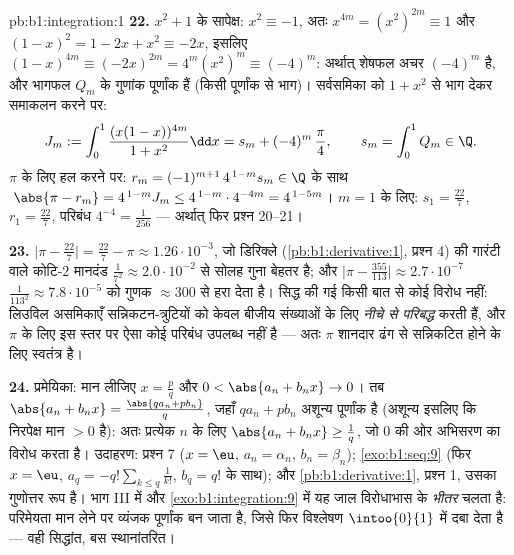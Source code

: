 \begin{solution}{pb:b1:integration:1}
\textbf{22.} $x^2 + 1$ के सापेक्ष: $x^2 \equiv -1$, अतः $x^{4m} = (x^2)^{2m}
\equiv 1$ और $(1 - x)^2 = 1 - 2x + x^2 \equiv -2x$, इसलिए $(1-x)^{4m} \equiv
(-2x)^{2m} = 4^m (x^2)^m \equiv (-4)^m$: अर्थात् शेषफल अचर $(-4)^m$ है, और
भागफल $Q_m$ के गुणांक पूर्णांक हैं (किसी  पूर्णांक  से भाग)।
सर्वसमिका को $1 + x^2$ से भाग देकर समाकलन करने पर:
\[
J_m := \int_0^1 \frac{(x(1-x))^{4m}}{1+x^2}\dd x
= s_m + (-4)^m\,\frac{\pi}{4},
\qquad s_m = \int_0^1 Q_m \in \Q .
\]
$\pi$ के लिए हल करने पर: $r_m = (-1)^{m+1}\,4^{\,1-m} s_m \in \Q$ के साथ
$\;\abs{\pi - r_m} = 4^{\,1-m} J_m \leq 4^{\,1-m}\cdot4^{-4m} = 4^{\,1-5m}$।
$m = 1$ के लिए: $s_1 = \frac{22}{7}$, $r_1 = \frac{22}{7}$, परिबंध $4^{-4} =
\frac{1}{256}$ --- अर्थात् फिर प्रश्न 20--21।

\textbf{23.} $\bigl|\pi - \frac{22}{7}\bigr| = \frac{22}{7} - \pi \approx
1.26\cdot10^{-3}$, जो डिरिक्ले (\cref{pb:b1:derivative:1}, प्रश्न 4) की
गारंटी वाले कोटि-$2$ मानदंड $\frac{1}{7^2} \approx 2.0\cdot10^{-2}$ से सोलह
गुना बेहतर है; और $\bigl|\pi - \frac{355}{113}\bigr| \approx
2.7\cdot10^{-7}$ $\frac{1}{113^2} \approx 7.8\cdot10^{-5}$ को गुणक $\approx
300$ से हरा देता है। सिद्ध की गई किसी बात से कोई विरोध नहीं: लिउविल असमिकाएँ
सन्निकटन-त्रुटियों को केवल बीजीय संख्याओं के लिए \emph{नीचे से परिबद्ध} करती
हैं, और $\pi$ के लिए इस स्तर पर ऐसा कोई परिबंध उपलब्ध नहीं है --- अतः $\pi$
शानदार ढंग से सन्निकटित होने के लिए स्वतंत्र है।

\textbf{24.} प्रमेयिका: मान लीजिए $x = \frac pq$ और $0 < \abs{a_n + b_n x}
\to 0$। तब $\abs{a_n + b_n x} = \frac{\abs{q a_n + p b_n}}{q}$, जहाँ $q a_n
+ p b_n$ अशून्य पूर्णांक है (अशून्य इसलिए कि निरपेक्ष मान $> 0$ है): अतः
प्रत्येक $n$ के लिए $\abs{a_n + b_n x} \geq \frac1q$, जो $0$ की ओर अभिसरण का
विरोध करता है। उदाहरण: प्रश्न 7 ($x = \eu$, $a_n = \alpha_n$, $b_n =
\beta_n$); \cref{exo:b1:seq:9} (फिर $x = \eu$, $a_q = -q!\sum_{k \leq
q}\frac{1}{k!}$, $b_q = q!$ के साथ); और \cref{pb:b1:derivative:1}, प्रश्न 1,
उसका गुणोत्तर रूप है। भाग III में और \cref{exo:b1:integration:9} में यह जाल
विरोधाभास के \emph{भीतर} चलता है: परिमेयता मान लेने पर व्यंजक पूर्णांक बन
जाता है, जिसे फिर विश्लेषण $\intoo{0}{1}$ में दबा देता है --- वही सिद्धांत,
बस स्थानांतरित।


\end{solution}
